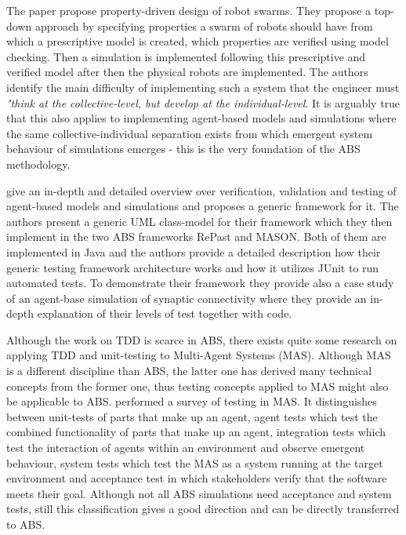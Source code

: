 The paper \cite{brambilla_property-driven_2012} propose property-driven design of robot swarms. They propose a top-down approach by specifying properties a swarm of robots should have from which a prescriptive model is created, which properties are verified using model checking. Then a simulation is implemented following this prescriptive and verified model after then the physical robots are implemented. The authors identify the main difficulty of implementing such a system that the engineer must \textit{"think at the collective-level, but develop at the individual-level}. It is arguably true that this also applies to implementing agent-based models and simulations where the same collective-individual separation exists from which emergent system behaviour of simulations emerges - this is the very foundation of the ABS methodology.

\cite{gurcan_generic_2013} give an in-depth and detailed overview over verification, validation and testing of agent-based models and simulations and proposes a generic framework for it. The authors present a generic UML class-model for their framework which they then implement in the two ABS frameworks RePast and MASON. Both of them are implemented in Java and the authors provide a detailed description how their generic testing framework architecture works and how it utilizes JUnit to run automated tests. To demonstrate their framework they provide also a case study of an agent-base simulation of synaptic connectivity where they provide an in-depth explanation of their levels of test together with code.

Although the work on TDD is scarce in ABS, there exists quite some research on applying TDD and unit-testing to Multi-Agent Systems (MAS). Although MAS is a different discipline than ABS, the latter one has derived many technical concepts from the former one, thus testing concepts applied to MAS might also be applicable to ABS. \cite{nguyen_testing_2011} performed a survey of testing in MAS. It distinguishes between unit-tests of parts that make up an agent, agent tests which test the combined functionality of parts that make up an agent, integration tests which test the interaction of agents within an environment and observe emergent behaviour, system tests which test the MAS as a system running at the target environment and acceptance test in which stakeholders verify that the software meets their goal. Although not all ABS simulations need acceptance and system tests, still this classification gives a good direction and can be directly transferred to ABS.  %

